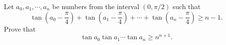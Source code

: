 Let $a_0,a_1,\cdots ,a_n$ be numbers from the interval $\left(0,\pi/2\right)$ such that \[ \tan \left(a_0-\frac{\pi}{4}\right)+ \tan \left(a_1-\frac{\pi}{4}\right)+\cdots +\tan \left(a_n-\frac{\pi}{4}\right)\geq n-1.  \] Prove that \[ \tan a_0\tan a_1 \cdots \tan a_n\geq n^{n+1}.  \]

